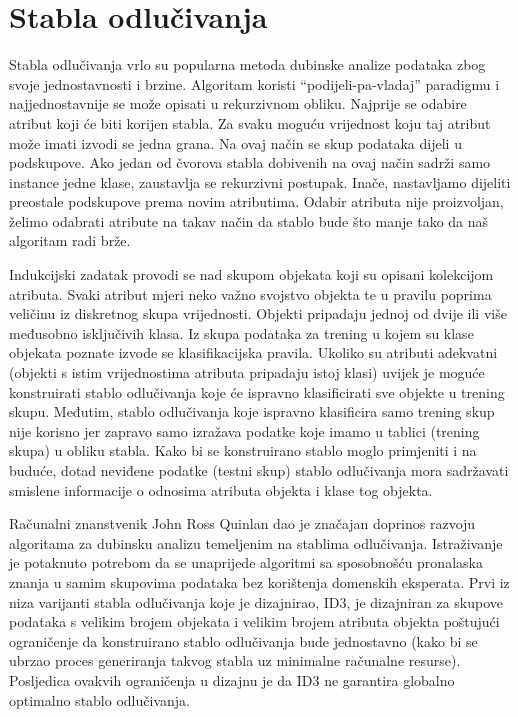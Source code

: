 \section{Stabla odlučivanja}
\label{ch:ch3}

Stabla odlučivanja vrlo su popularna metoda dubinske analize podataka zbog svoje jednostavnosti i brzine. Algoritam koristi “podijeli-pa-vladaj” paradigmu i najjednostavnije se može opisati u rekurzivnom obliku. Najprije se odabire atribut koji će biti korijen stabla. Za svaku moguću vrijednost koju taj atribut može imati izvodi se jedna grana. Na ovaj način se skup podataka dijeli u podskupove. Ako jedan od čvorova stabla dobivenih na ovaj način sadrži samo instance jedne klase, zaustavlja se rekurzivni postupak. Inače, nastavljamo dijeliti preostale podskupove prema novim atributima. Odabir atributa nije proizvoljan, želimo odabrati atribute na takav način da stablo bude što manje tako da naš algoritam radi brže. 

Indukcijski zadatak provodi se nad skupom objekata koji su opisani kolekcijom atributa. Svaki atribut mjeri neko važno svojstvo objekta te u pravilu poprima veličinu iz diskretnog skupa vrijednosti. Objekti pripadaju jednoj od dvije ili više međusobno isključivih klasa. Iz skupa podataka za trening u kojem su klase objekata poznate izvode se klasifikacijska pravila. Ukoliko su atributi adekvatni (objekti s istim vrijednostima atributa pripadaju istoj klasi) uvijek je moguće konstruirati stablo odlučivanja koje će ispravno klasificirati sve objekte u trening skupu\cite{Witten01}. 
Međutim, stablo odlučivanja koje ispravno klasificira samo trening skup nije korisno jer zapravo samo izražava podatke koje imamo u tablici (trening skupa) u obliku stabla. Kako bi se  konstruirano stablo moglo primjeniti i na buduće, dotad neviđene podatke (testni skup) stablo odlučivanja mora sadržavati smislene informacije o odnosima atributa objekta i klase tog objekta. 

Računalni znanstvenik John Ross Quinlan dao je značajan doprinos razvoju algoritama za dubinsku analizu temeljenim na stablima odlučivanja\cite{Wu01}\cite{Quinlan02}. Istraživanje je potaknuto potrebom da se unaprijede algoritmi sa sposobnošću pronalaska znanja u samim skupovima podataka bez korištenja domenskih eksperata. Prvi iz niza varijanti stabla odlučivanja koje je dizajnirao, ID3, je dizajniran za skupove podataka s velikim brojem objekata i velikim brojem atributa objekta poštujući ograničenje da konstruirano stablo odlučivanja bude jednostavno (kako bi se ubrzao proces generiranja takvog stabla uz minimalne računalne resurse). Posljedica ovakvih ograničenja u dizajnu je da ID3 ne garantira globalno optimalno stablo odlučivanja\cite{Quinlan02}.

